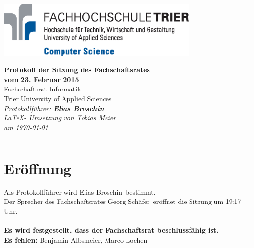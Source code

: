\documentclass[a4paper, 11pt]{article} %
\newcommand{\protokoller}{Elias Broschin}
\newcommand{\dateOfMeeting}{23. Februar 2015}
\newcommand{\TeXer}{Tobias Meier}
\newcommand{\fsiPresident}{Georg Schäfer}
\begin{document}

\doublespacing
\thispagestyle{empty}

\begin{center}
\includegraphics[width=10.0cm]{../logo_faculty_computer_science.eps}

\vspace*{\fill}
{\LARGE \textbf{Protokoll der Sitzung des Fachschaftsrates \\vom \dateOfMeeting}}\\
Fachschaftsrat Informatik\\
Trier University of Applied Sciences\\
\vspace{2.5cm}
\textit{
	Protokollführer: \textbf{\protokoller} \\
	\LaTeX - Umsetzung von \TeXer\\
	am \today
}
\vfill
\end{center}

\hspace*{-35cm}
\textcolor{fsi}{\rule{64.9cm}{15pt}}
\pagebreak
 
\setcounter{tocdepth}{2}
\tableofcontents 
\pagebreak

\section{Eröffnung}
Als Protokollführer wird \protokoller~bestimmt.\\
Der Sprecher des Fachschaftsrates \fsiPresident~eröffnet die Sitzung um 19:17 Uhr.
\\\\
\textbf{Es wird festgestellt, dass der Fachschaftsrat beschlussfähig ist.}\\
\textbf{Es fehlen:} Benjamin Albsmeier, Marco Lochen 
\end{document}
